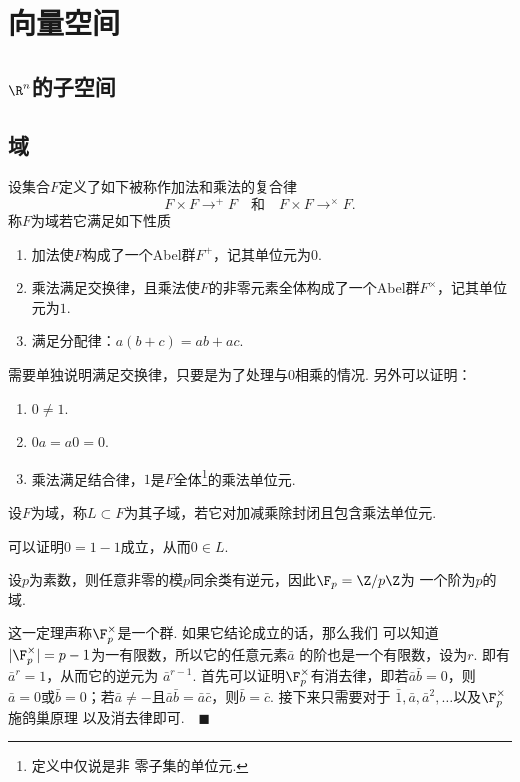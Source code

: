 \section{向量空间}

\subsection{$\R^n$的子空间}

\subsection{域}

  \begin{defi}[域]
    设集合$F$定义了如下被称作加法和乘法的复合律
    \[
      F\times F\to^{+} F \quad\text{和}\quad F\times F\to^{\times}F.
    \]
    称$F$为域若它满足如下性质
    \begin{enumerate}
      \item 加法使$F$构成了一个Abel群$F^+$，记其单位元为$0$.
      \item 乘法满足交换律，且乘法使$F$的非零元素全体构成了一个Abel群$F^\times$，记其单位元为$1$.
      \item 满足分配律：$a(b+c)=ab+ac$.
    \end{enumerate}
  \end{defi}
  \remark
    [2.]需要单独说明满足交换律，只要是为了处理与$0$相乘的情况. 另外可以证明：
    \begin{enumerate}
      \item $0\ne 1$.
      \item $0a=a0=0$.
      \item 乘法满足结合律，$1$是$F$全体\footnote{定义中仅说是非
      零子集的单位元.}的乘法单位元.
    \end{enumerate}

  \begin{defi}[子域]
    设$F$为域，称$L\subset F$为其子域，若它对加减乘除封闭且包含乘法单位元.
  \end{defi}
  \remark
    可以证明$0=1-1$成立，从而$0\in L$.

  \begin{thm}
    设$p$为素数，则任意非零的模$p$同余类有逆元，因此$\F_p=\Z/p\Z$为
    一个阶为$p$的域.
  \end{thm}
  \remark
    这一定理声称$\F_p^\times$是一个群. 如果它结论成立的话，那么我们
    可以知道$|\F_p^\times|=p-1$为一有限数，所以它的任意元素$\bar{a}$
    的阶也是一个有限数，设为$r$. 即有$\bar{a}^r=1$，从而它的逆元为
    $\bar{a}^{r-1}$.
  \proof
    首先可以证明$\F_p^\times$有消去律，即若$\bar{a}\bar{b}=0$，则
    $\bar{a}=0$或$\bar{b}=0$；若$\bar{a}\ne -$且$\bar{a}\bar{b}
    =\bar{a}\bar{c}$，则$\bar{b}=\bar{c}$. 接下来只需要对于
    $\bar{1},\bar{a},\bar{a}^2,\dots$以及$\F_p^\times$施鸽巢原理
    以及消去律即可.$\quad\blacksquare$

